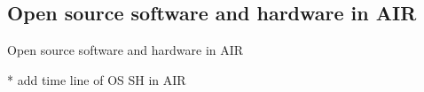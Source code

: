 \subsection{Open source software and hardware in AIR}

{
\begin{frame}{Open source software and hardware in AIR}

* add time line of OS SH in AIR
      \begin{figure}
        \centering
      \end{figure}
\end{frame}
}

